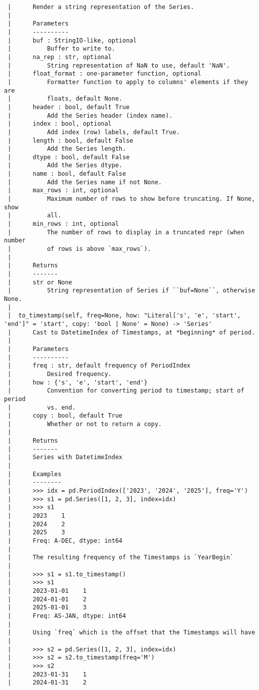 \documentclass[
  letterpaper,
  DIV=11,
  numbers=noendperiod]{scrreprt}
\begin{document}
\begin{verbatim}
 |      Render a string representation of the Series.
 |      
 |      Parameters
 |      ----------
 |      buf : StringIO-like, optional
 |          Buffer to write to.
 |      na_rep : str, optional
 |          String representation of NaN to use, default 'NaN'.
 |      float_format : one-parameter function, optional
 |          Formatter function to apply to columns' elements if they are
 |          floats, default None.
 |      header : bool, default True
 |          Add the Series header (index name).
 |      index : bool, optional
 |          Add index (row) labels, default True.
 |      length : bool, default False
 |          Add the Series length.
 |      dtype : bool, default False
 |          Add the Series dtype.
 |      name : bool, default False
 |          Add the Series name if not None.
 |      max_rows : int, optional
 |          Maximum number of rows to show before truncating. If None, show
 |          all.
 |      min_rows : int, optional
 |          The number of rows to display in a truncated repr (when number
 |          of rows is above `max_rows`).
 |      
 |      Returns
 |      -------
 |      str or None
 |          String representation of Series if ``buf=None``, otherwise None.
 |  
 |  to_timestamp(self, freq=None, how: "Literal['s', 'e', 'start', 'end']" = 'start', copy: 'bool | None' = None) -> 'Series'
 |      Cast to DatetimeIndex of Timestamps, at *beginning* of period.
 |      
 |      Parameters
 |      ----------
 |      freq : str, default frequency of PeriodIndex
 |          Desired frequency.
 |      how : {'s', 'e', 'start', 'end'}
 |          Convention for converting period to timestamp; start of period
 |          vs. end.
 |      copy : bool, default True
 |          Whether or not to return a copy.
 |      
 |      Returns
 |      -------
 |      Series with DatetimeIndex
 |      
 |      Examples
 |      --------
 |      >>> idx = pd.PeriodIndex(['2023', '2024', '2025'], freq='Y')
 |      >>> s1 = pd.Series([1, 2, 3], index=idx)
 |      >>> s1
 |      2023    1
 |      2024    2
 |      2025    3
 |      Freq: A-DEC, dtype: int64
 |      
 |      The resulting frequency of the Timestamps is `YearBegin`
 |      
 |      >>> s1 = s1.to_timestamp()
 |      >>> s1
 |      2023-01-01    1
 |      2024-01-01    2
 |      2025-01-01    3
 |      Freq: AS-JAN, dtype: int64
 |      
 |      Using `freq` which is the offset that the Timestamps will have
 |      
 |      >>> s2 = pd.Series([1, 2, 3], index=idx)
 |      >>> s2 = s2.to_timestamp(freq='M')
 |      >>> s2
 |      2023-01-31    1
 |      2024-01-31    2

\end{verbatim}
\end{document}
